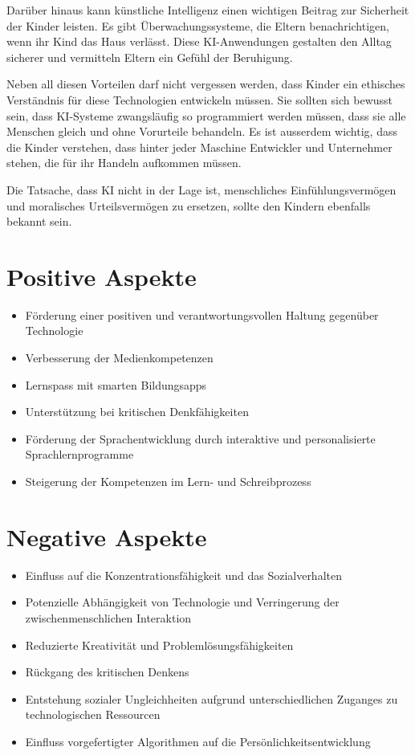 \documentclass{article}
\begin{document}
Darüber hinaus kann künstliche Intelligenz einen wichtigen Beitrag zur Sicherheit der Kinder leisten. Es gibt Überwachungssysteme, die Eltern benachrichtigen, wenn ihr Kind das Haus verlässt. Diese KI-Anwendungen gestalten den Alltag sicherer und vermitteln Eltern ein Gefühl der Beruhigung. 

Neben all diesen Vorteilen darf nicht vergessen werden, dass Kinder ein ethisches Verständnis für diese Technologien entwickeln müssen. Sie sollten sich bewusst sein, dass KI-Systeme zwangsläufig so programmiert werden müssen, dass sie alle Menschen gleich und ohne Vorurteile behandeln. Es ist ausserdem wichtig, dass die Kinder verstehen, dass hinter jeder Maschine Entwickler und Unternehmer stehen, die für ihr Handeln aufkommen müssen.

Die Tatsache, dass KI nicht in der Lage ist, menschliches Einfühlungsvermögen und moralisches Urteilsvermögen zu ersetzen, sollte den Kindern ebenfalls bekannt sein. 

\section{Positive Aspekte}

\begin{itemize}

    \item Förderung einer positiven und verantwortungsvollen Haltung gegenüber Technologie
    \item Verbesserung der Medienkompetenzen
    \item Lernspass mit smarten Bildungsapps
    \item Unterstützung bei kritischen Denkfähigkeiten
    \item Förderung der Sprachentwicklung durch interaktive und personalisierte Sprachlernprogramme
    \item Steigerung der Kompetenzen im Lern- und Schreibprozess

\end{itemize}

\section{Negative Aspekte}

\begin{itemize}

    \item Einfluss auf die Konzentrationsfähigkeit und das Sozialverhalten
    \item Potenzielle Abhängigkeit von Technologie und Verringerung der zwischenmenschlichen Interaktion
    \item Reduzierte Kreativität und Problemlösungsfähigkeiten
    \item Rückgang des kritischen Denkens
    \item Entstehung sozialer Ungleichheiten aufgrund unterschiedlichen Zuganges zu technologischen Ressourcen
    \item Einfluss vorgefertigter Algorithmen auf die Persönlichkeitsentwicklung

\end{itemize}
\end{document}
